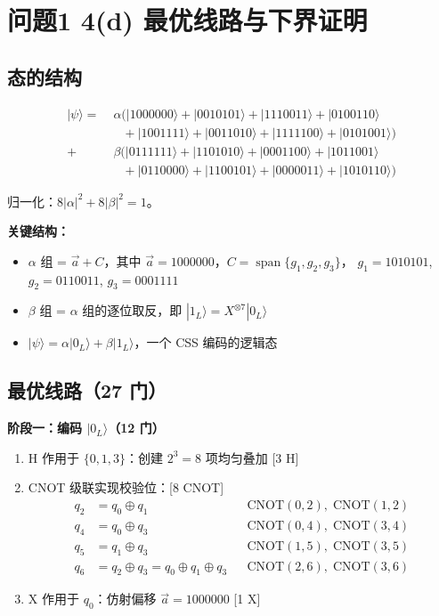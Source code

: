 \documentclass[12pt,a4paper]{ctexart}
\begin{document}
\section*{问题1 4(d) 最优线路与下界证明}

\subsection*{态的结构}

\begin{align*}
|\psi\rangle = &\;\alpha\bigl(|1000000\rangle + |0010101\rangle + |1110011\rangle + |0100110\rangle \\
&\quad + |1001111\rangle + |0011010\rangle + |1111100\rangle + |0101001\rangle\bigr) \\
+ &\;\beta\bigl(|0111111\rangle + |1101010\rangle + |0001100\rangle + |1011001\rangle \\
&\quad + |0110000\rangle + |1100101\rangle + |0000011\rangle + |1010110\rangle\bigr)
\end{align*}

归一化：$8|\alpha|^2+8|\beta|^2=1$。

\textbf{关键结构：}
\begin{itemize}
    \item $\alpha$ 组 = $\vec{a}+C$，其中 $\vec{a}=1000000$，$C=\operatorname{span}\{g_1,g_2,g_3\}$，
    $g_1{=}1010101$, $g_2{=}0110011$, $g_3{=}0001111$
    \item $\beta$ 组 = $\alpha$ 组的逐位取反，即 $|1_L\rangle = X^{\otimes 7}|0_L\rangle$
    \item $|\psi\rangle = \alpha|0_L\rangle + \beta|1_L\rangle$，一个 CSS 编码的逻辑态
\end{itemize}

\subsection*{最优线路（27 门）}

\vspace{4pt}
\noindent\textbf{阶段一：编码 $|0_L\rangle$（12 门）}
\begin{enumerate}[label=步骤\arabic*.]
    \item H 作用于 $\{0,1,3\}$：创建 $2^3=8$ 项均匀叠加 \hfill[3 H]
    \item CNOT 级联实现校验位：\hfill[8 CNOT]
          \begin{align*}
              q_2 &= q_0 \oplus q_1          &&\text{CNOT}(0,2),\;\text{CNOT}(1,2) \\
              q_4 &= q_0 \oplus q_3          &&\text{CNOT}(0,4),\;\text{CNOT}(3,4) \\
              q_5 &= q_1 \oplus q_3          &&\text{CNOT}(1,5),\;\text{CNOT}(3,5) \\
              q_6 &= q_2 \oplus q_3 = q_0 \oplus q_1 \oplus q_3 &&\text{CNOT}(2,6),\;\text{CNOT}(3,6)
          \end{align*}
    \item X 作用于 $q_0$：仿射偏移 $\vec{a}=1000000$ \hfill[1 X]
\end{enumerate}
\end{document}
